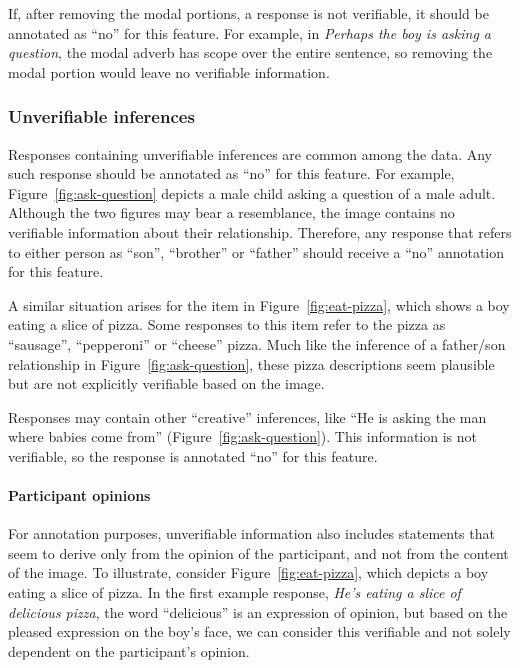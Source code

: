 \documentclass[12pt,notitlepage]{article}
\begin{document}
If, after removing the modal portions, a response is not verifiable, it should be annotated as ``no'' for this feature. For example, in \textit{Perhaps the boy is asking a question}, the modal adverb has scope over the entire sentence, so removing the modal portion would leave no verifiable information.

\subsubsection{Unverifiable inferences} Responses containing unverifiable inferences are common among the data. Any such response should be annotated as ``no'' for this feature. For example, Figure~\ref{fig:ask-question} depicts a male child asking a question of a male adult. Although the two figures may bear a resemblance, the image contains no verifiable information about their relationship. Therefore, any response that refers to either person as ``son'', ``brother'' or ``father'' should receive a ``no'' annotation for this feature.

A similar situation arises for the item in Figure~\ref{fig:eat-pizza}, which shows a boy eating a slice of pizza. Some responses to this item refer to the pizza as ``sausage'', ``pepperoni'' or ``cheese'' pizza. Much like the inference of a father/son relationship in Figure~\ref{fig:ask-question}, these pizza descriptions seem plausible but are not explicitly verifiable based on the image.


Responses may contain other ``creative'' inferences, like ``He is asking the man where babies come from'' (Figure~\ref{fig:ask-question}). This information is not verifiable, so the response is annotated ``no'' for this feature.

\paragraph{Participant opinions} For annotation purposes, unverifiable information also includes statements that seem to derive only from the opinion of the participant, and not from the content of the image. To illustrate, consider Figure~\ref{fig:eat-pizza}, which depicts a boy eating a slice of pizza. In the first example response, \textit{He's eating a slice of delicious pizza}, the word ``delicious'' is an expression of opinion, but based on the pleased expression on the boy's face, we can consider this verifiable and not solely dependent on the participant's opinion.
\end{document}
